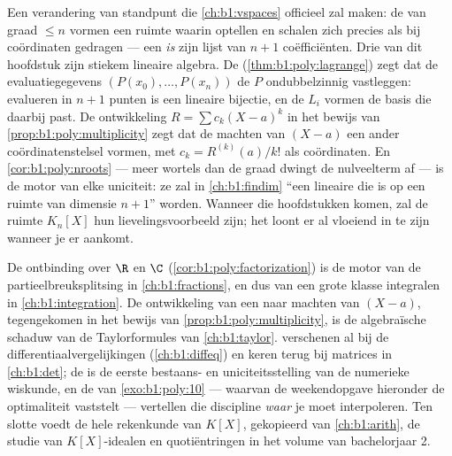 \begin{remark}\label{rem:b1:poly:interlude}
Een verandering van standpunt die \cref{ch:b1:vspaces} officieel zal
maken: de  van graad $\leq n$ vormen een ruimte waarin optellen
en schalen zich precies als bij coördinaten gedragen --- een 
\emph{is} zijn lijst van $n + 1$ coëfficiënten. Drie  van dit
hoofdstuk zijn stiekem lineaire algebra. De 
(\cref{thm:b1:poly:lagrange}) zegt dat de evaluatiegegevens $(P(x_0),
\dots, P(x_n))$ de  $P$ ondubbelzinnig vastleggen: evalueren in $n
+ 1$ punten is een lineaire bijectie, en de $L_i$ vormen de basis die
daarbij past. De ontwikkeling $R = \sum c_k(X - a)^k$ in het bewijs van
\cref{prop:b1:poly:multiplicity} zegt dat de machten van $(X - a)$ een
ander coördinatenstelsel vormen, met $c_k = R^{(k)}(a)/k!$ als
coördinaten. En \cref{cor:b1:poly:nroots} --- meer wortels dan de graad
dwingt de nulveelterm af --- is de motor van elke uniciteit: ze zal in
\cref{ch:b1:findim} ``een lineaire  die  is op een
ruimte van dimensie $n + 1$'' worden. Wanneer die hoofdstukken komen, zal
de ruimte $K_n[X]$ hun lievelingsvoorbeeld zijn; het loont er al vloeiend
in te zijn wanneer je er aankomt.
\end{remark}

\begin{remark}\label{rem:b1:poly:whereused}
De ontbinding over $\R$ en $\C$ (\cref{cor:b1:poly:factorization}) is de
motor van de partieelbreuksplitsing in \cref{ch:b1:fractions}, en dus van
een grote klasse integralen in \cref{ch:b1:integration}. De ontwikkeling
van een  naar machten van $(X - a)$, tegengekomen in het bewijs
van \cref{prop:b1:poly:multiplicity}, is de algebraïsche schaduw van de
Taylorformules van \cref{ch:b1:taylor}. 
verschenen al bij de differentiaalvergelijkingen (\cref{ch:b1:diffeq}) en
keren terug bij matrices in \cref{ch:b1:det}; de  is
de eerste bestaans- en uniciteitsstelling van de numerieke wiskunde, en de
 van \cref{exo:b1:poly:10} --- waarvan de
weekendopgave hieronder de optimaliteit vaststelt --- vertellen die
discipline \emph{waar} je moet interpoleren. Ten slotte voedt de hele
rekenkunde van $K[X]$, gekopieerd van \cref{ch:b1:arith}, de studie van
$K[X]$-idealen en quotiëntringen in het volume van bachelorjaar 2.
\end{remark}

